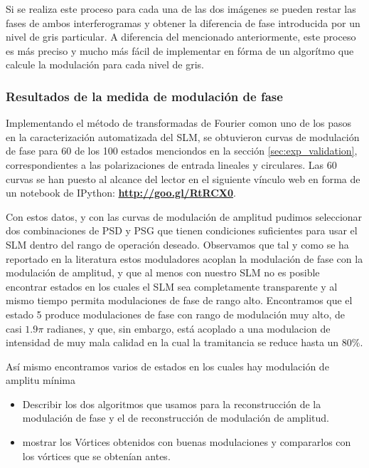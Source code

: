 Si se realiza este proceso para cada una de las dos imágenes se pueden restar las
fases de ambos interferogramas y obtener la diferencia de fase
introducida por un nivel de gris particular. A diferencia del
mencionado anteriormente, este proceso es más preciso y mucho más fácil de implementar en fórma de
un algorítmo que calcule la modulación para cada nivel de gris. 
\pagebreak
\subsubsection{Resultados de la medida de modulación de fase}

Implementando el método de transformadas de Fourier comon uno de los
pasos en la caracterización automatizada del SLM, se obtuvieron curvas de modulación
de fase para 60 de los 100 estados menciondos en la sección
\ref{sec:exp_validation}, correspondientes a las polarizaciones de
entrada lineales y circulares.  Las 60 curvas se han puesto al alcance del
lector en el siguiente vínculo web en forma de un notebook de IPython:
\href{http://goo.gl/RtRCX0}{\textbf{http://goo.gl/RtRCX0}}.  

Con estos datos, y con las curvas de modulación de amplitud pudimos
seleccionar dos combinaciones de PSD y PSG que tienen condiciones
suficientes para usar el SLM dentro del rango de operación
deseado. Observamos que tal y como se ha reportado en la literatura
estos moduladores acoplan la modulación de fase con la modulación de
amplitud, y que al menos con nuestro SLM no es posible encontrar
estados en los cuales el SLM sea completamente transparente y al mismo
tiempo permita modulaciones de fase de rango alto.  
Encontramos que el estado 5 produce modulaciones de fase con rango de
modulación muy alto, de casi $1.9\pi$
radianes, y que, sin embargo, está acoplado a una modulacion de intensidad de muy mala calidad en
la cual la tramitancia se reduce hasta un $80\%$.


Así mismo encontramos varios de estados en los cuales hay modulación
de amplitu mínima





\begin{itemize}
\item Describir los dos algoritmos que usamos para la reconstrucción
  de la modulación de fase y el de reconstrucción de modulación de
  amplitud. 
\item mostrar los Vórtices obtenidos con buenas modulaciones y
  compararlos con los vórtices que se obtenían antes.
\end{itemize}
\newpage
\pagebreak[4]
